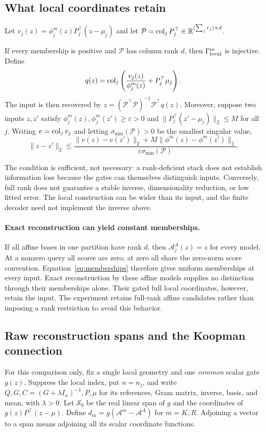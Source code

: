 \subsection{What local coordinates retain}
Let $v_j(z)=\phi_j^m(z)P_j^\top(z-\mu_j)$ and let $\mathcal P=\operatorname{col}_j P_j^\top\in\mathbb R^{(\sum_jr_j)\times d}$.
\begin{proposition}\label{prop:local}
If every membership is positive and $\mathcal P$ has column rank $d$, then $\Gamma^m_{\mathrm{local}}$ is injective. Define
\[
 q(z)=\operatorname{col}_j\left(\frac{v_j(z)}{\phi_j^m(z)}+P_j^\top\mu_j\right).
\]
The input is then recovered by $z=(\mathcal P^\top\mathcal P)^{-1}\mathcal P^\top q(z)$.
Moreover, suppose two inputs $z,z'$ satisfy $\phi_j^m(z),\phi_j^m(z')\geq\varepsilon>0$ and $\|P_j^\top(z'-\mu_j)\|_2\leq M$ for all $j$. Writing $v=\operatorname{col}_jv_j$ and letting $\sigma_{\min}(\mathcal P)>0$ be the smallest singular value,
\begin{equation}
 \|z-z'\|_2\leq
 \frac{\|v(z)-v(z')\|_2+M\|\phi^m(z)-\phi^m(z')\|_2}
 {\varepsilon\sigma_{\min}(\mathcal P)}.
 \label{eq:conditioning}
\end{equation}
\end{proposition}
The condition is sufficient, not necessary: a rank-deficient stack does not establish information loss because the gates can themselves distinguish inputs. Conversely, full rank does not guarantee a stable inverse, dimensionality reduction, or low fitted error. The local construction can be wider than its input, and the finite decoder need not implement the inverse above.

\paragraph{Exact reconstruction can yield constant memberships.}
If all affine bases in one partition have rank $d$, then $\mathcal A^A_j(z)=z$ for every model. At a nonzero query all scores are zero; at zero all share the zero-norm score convention. Equation~\eqref{eq:memberships} therefore gives uniform memberships at every input. Exact reconstruction by these affine models supplies no distinction through their memberships alone. Their gated full local coordinates, however, retain the input. The experiment retains full-rank affine candidates rather than imposing a rank restriction to avoid this behavior.

\subsection{Raw reconstruction spans and the Koopman connection}\label{sec:rawspan}
For this comparison only, fix a single local geometry and one \emph{common} scalar gate $g(z)$. Suppress the local index, put $n=n_j$, and write $Q,G,C=(G+\lambda I_n)^{-1},P,\mu$ for its references, Gram matrix, inverse, basis, and mean, with $\lambda>0$. Let $\mathcal S_0$ be the real linear span of $g$ and the coordinates of $g(z)P^\top(z-\mu)$. Define $d_m=g(\mathcal A^m-\mathcal A^A)$ for $m=K,R$. Adjoining a vector to a span means adjoining all its scalar coordinate functions.

